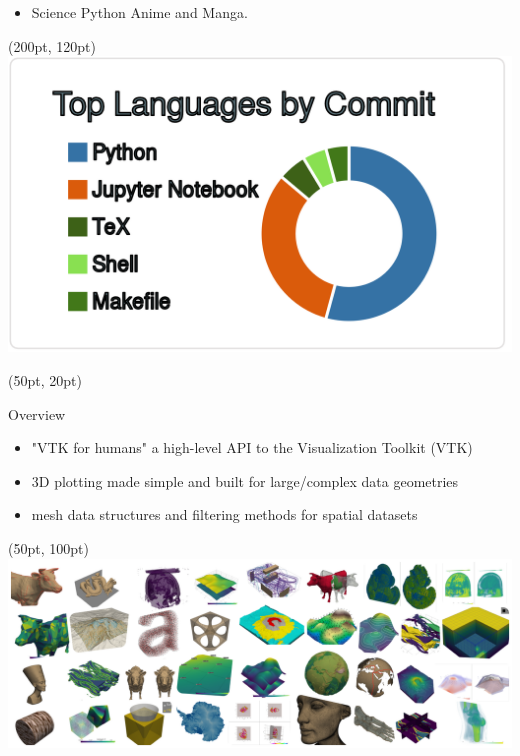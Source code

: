 \documentclass[aspectratio=169,12pt]{beamer}
\begin{document}
\begin{frame}[fragile]
\begin{textblock*}{350pt}
\begin{itemize}
\item {} Science Python Anime and Manga.
\end{itemize}
\end{textblock*}
\begin{textblock*}{350pt}(200pt, 120pt)
\includegraphics[width=0.50\linewidth]{2-most-commit-language.png}
\end{textblock*}
\end{frame}

\begin{frame}[fragile]
\begin{textblock*}{800pt}(50pt, 20pt)
\begin{block}{Overview}
\begin{itemize}
\item "VTK for humans"\: a high-level API to the Visualization Toolkit (VTK)
\item 3D plotting made simple and built for large/complex data geometries
\item mesh data structures and filtering methods for spatial datasets
\end{itemize}
\end{block}
\end{textblock*}
\begin{textblock*}{800pt}(50pt, 100pt)
\includegraphics[width=0.50\linewidth]{pyvista_banner_small.png}
\end{textblock*}
\end{frame}
\end{document}

